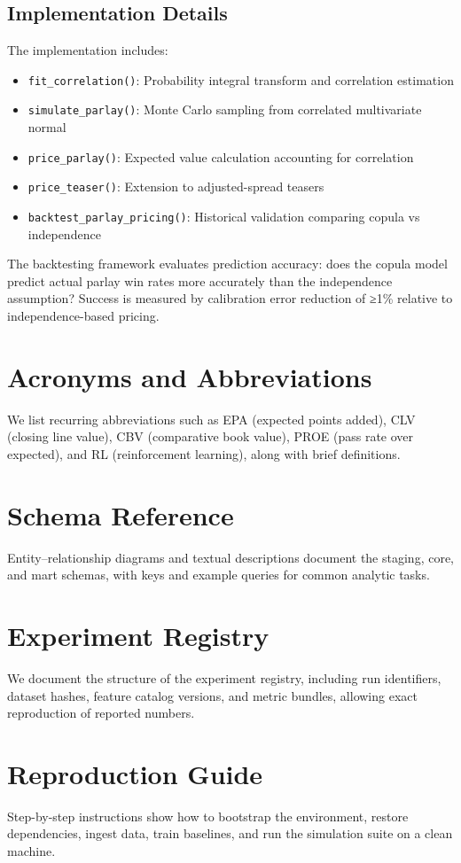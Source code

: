 \documentclass[12pt]{report}  %
\numberwithin{equation}{section}
\theoremstyle{plain}
\theoremstyle{definition}
\theoremstyle{remark}
\begin{document}
\subsection{Implementation Details}
The implementation includes:
\begin{itemize}
  \item \texttt{fit\_correlation()}: Probability integral transform and correlation estimation
  \item \texttt{simulate\_parlay()}: Monte Carlo sampling from correlated multivariate normal
  \item \texttt{price\_parlay()}: Expected value calculation accounting for correlation
  \item \texttt{price\_teaser()}: Extension to adjusted-spread teasers
  \item \texttt{backtest\_parlay\_pricing()}: Historical validation comparing copula vs independence
\end{itemize}

The backtesting framework evaluates prediction accuracy: does the copula model predict actual parlay win rates more accurately than the independence assumption? Success is measured by calibration error reduction of ≥1\% relative to independence-based pricing.

\section{Acronyms and Abbreviations}
We list recurring abbreviations such as EPA (expected points added), CLV (closing line value), CBV (comparative book value), PROE (pass rate over expected), and RL (reinforcement learning), along with brief definitions.

\section{Schema Reference}
Entity--relationship diagrams and textual descriptions document the staging, core, and mart schemas, with keys and example queries for common analytic tasks.

\section{Experiment Registry}
We document the structure of the experiment registry, including run identifiers, dataset hashes, feature catalog versions, and metric bundles, allowing exact reproduction of reported numbers.

\section{Reproduction Guide}
Step-by-step instructions show how to bootstrap the environment, restore dependencies, ingest data, train baselines, and run the simulation suite on a clean machine.
\end{document}
